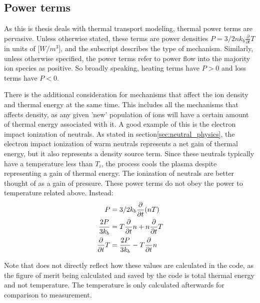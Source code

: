 \begin{refsection}
\section{Power terms}\label{app_sec:power_terms}

As this is thesis deals with thermal transport modeling, thermal power terms are pervasive. Unless otherwise stated, these terms are power densities $P = 3/2nk_b \frac{\partial}{\partial t}T$ in units of [$W/m^3$], and the subscript describes the type of mechanism. Similarly, unless otherwise specified, the power terms refer to power flow into the majority ion species as positive. So broadly speaking, heating terms have $P > 0$ and loss terms have $P < 0$.

There is the additional consideration for mechanisms that affect the ion density and thermal energy at the same time. This includes all the mechanisms that affects density, as any given 'new' population of ions will have a certain amount of thermal energy associated with it. A good example of this is the electron impact ionization of neutrals. As stated in section\ref{sec:neutral_physics}, the electron impact ionization of warm neutrals represents a net gain of thermal energy, but it also represents a density source term. Since these neutrals typically have a temperature less than $T_i$, the process cools the plasma despite representing a gain of thermal energy. The ionization of neutrals are better thought of as a gain of pressure. These power terms do not obey the power to temperature related above. Instead:
\begin{align}
    P &= 3/2k_b \frac{\partial}{\partial t}(n T) \\
    \frac{2P}{3k_b} &= T\frac{\partial}{\partial t} n + n \frac{\partial}{\partial t} T \\
    \frac{\partial}{\partial t} T &= \frac{2P}{3k_b} - T\frac{\partial}{\partial t} n 
\end{align}

Note that does not directly reflect how these values are calculated in the code, as the figure of merit being calculated and saved by the code is total thermal energy and not temperature. The temperature is only calculated afterwards for comparison to measurement. 


\end{refsection}
